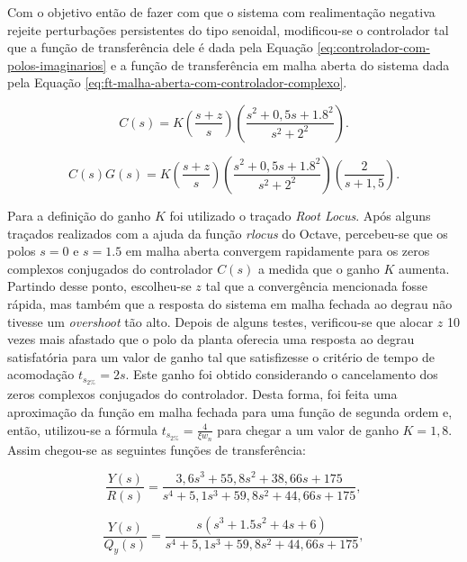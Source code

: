 Com o objetivo então de fazer com que o sistema com realimentação negativa
rejeite perturbações persistentes do tipo senoidal, modificou-se o controlador
tal que a função de transferência dele é dada pela Equação
\ref{eq:controlador-com-polos-imaginarios} e a função de transferência em malha
aberta do sistema dada pela Equação
\ref{eq:ft-malha-aberta-com-controlador-complexo}.

\begin{equation}
    \label{eq:controlador-com-polos-imaginarios}
    C(s) = K\left(\frac{s + z}{s}\right)\left(\frac{s^2 + 0,5s + 1.8^2}{s^2 + 2^2}\right).
\end{equation}

\begin{equation}
    \label{eq:ft-malha-aberta-com-controlador-complexo}
    C(s)G(s) = K\left(\frac{s + z}{s}\right)
    \left(\frac{s^2 + 0,5s + 1.8^2}{s^2 + 2^2}\right)
    \left(\frac{2}{s+1,5}\right).
\end{equation}

Para a definição do ganho $K$ foi utilizado o traçado \textit{Root Locus}. Após
alguns traçados realizados com a ajuda da função \textit{rlocus} do Octave,
percebeu-se que os polos $s = 0$ e $s = 1.5$ em malha aberta convergem
rapidamente para os zeros complexos conjugados do controlador $C(s)$ a medida
que o ganho $K$ aumenta. Partindo desse ponto, escolheu-se $z$ tal que a
convergência mencionada fosse rápida, mas também que a resposta do sistema em
malha fechada ao degrau não tivesse um \textit{overshoot} tão alto. Depois de
alguns testes, verificou-se que alocar $z$ 10 vezes mais afastado que o polo da
planta oferecia uma resposta ao degrau satisfatória para um valor de ganho tal
que satisfizesse o critério de tempo de acomodação $t_{s_{2\%}} = 2s$. Este
ganho foi obtido considerando o cancelamento dos zeros complexos conjugados do
controlador. Desta forma, foi feita uma aproximação da função em malha fechada
para uma função de segunda ordem e, então, utilizou-se a fórmula $t_{s_{2\%}} =
\frac{4}{\xi w_{n}}$ para chegar a um valor de ganho $K = 1,8$. Assim chegou-se
as seguintes funções de transferência:

\begin{equation}
    \label{eq:y2r-solucionado-cenario4-c}
    \frac{Y(s)}{R(s)} = \frac{3,6s^3 + 55,8s^2 + 38,66s + 175}
    {s^4 + 5,1s^3 + 59,8s^2 + 44,66s + 175},
\end{equation}

\begin{equation}
    \label{eq:y2qy-solucionado-cenario4-c}
    \frac{Y(s)}{Q_{y}(s)} = \frac{s(s^3 + 1.5s^2 + 4s + 6)}
    {s^4 + 5,1s^3 + 59,8s^2 + 44,66s + 175},
\end{equation}

